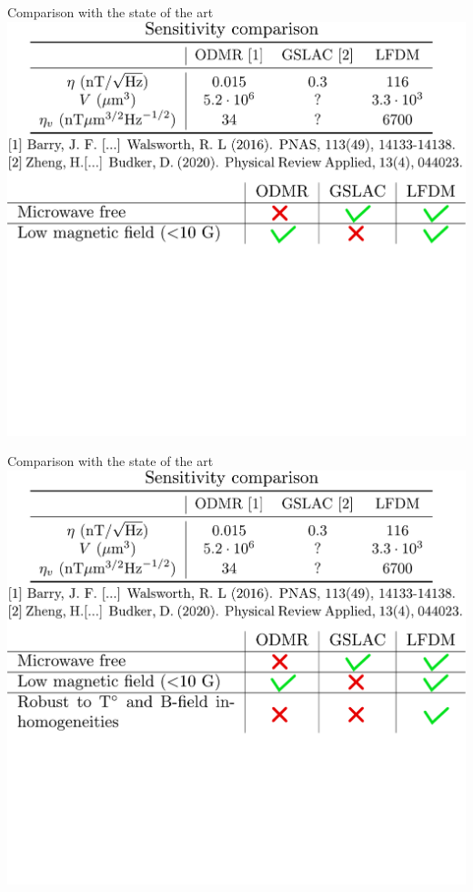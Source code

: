 \documentclass{beamer}
\begin{document}
\begin{frame}{Comparison with the state of the art}
\centering
\includegraphics[width=\textwidth,height=0.85\textheight,keepaspectratio]{Slide_comparison_litterature_f-3}
\end{frame}

\begin{frame}{Comparison with the state of the art}
\centering
\includegraphics[width=\textwidth,height=0.85\textheight,keepaspectratio]{Slide_comparison_litterature_f-2}
\end{frame}
\end{document}
